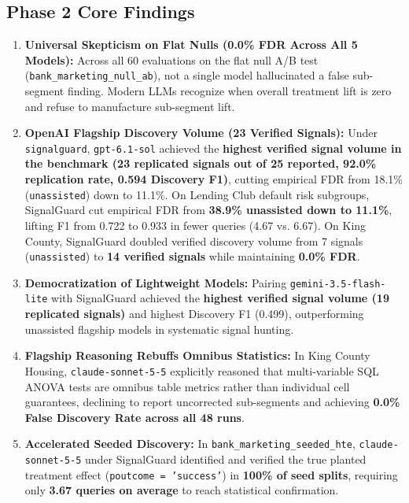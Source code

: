 \documentclass[11pt,a4paper]{article}
\begin{document}
\subsection{Phase 2 Core Findings}
\begin{enumerate}
    \item \textbf{Universal Skepticism on Flat Nulls (0.0\% FDR Across All 5 Models):} Across all 60 evaluations on the flat null A/B test (\texttt{bank\_marketing\_null\_ab}), not a single model hallucinated a false sub-segment finding. Modern LLMs recognize when overall treatment lift is zero and refuse to manufacture sub-segment lift.
    \item \textbf{OpenAI Flagship Discovery Volume (23 Verified Signals):} Under \texttt{signalguard}, \texttt{gpt-6.1-sol} achieved the \textbf{highest verified signal volume in the benchmark (23 replicated signals out of 25 reported, 92.0\% replication rate, 0.594 Discovery F1)}, cutting empirical FDR from 18.1\% (\texttt{unassisted}) down to 11.1\%. On Lending Club default risk subgroups, SignalGuard cut empirical FDR from \textbf{38.9\% unassisted down to 11.1\%}, lifting F1 from 0.722 to 0.933 in fewer queries (4.67 vs. 6.67). On King County, SignalGuard doubled verified discovery volume from 7 signals (\texttt{unassisted}) to \textbf{14 verified signals} while maintaining \textbf{0.0\% FDR}.
    \item \textbf{Democratization of Lightweight Models:} Pairing \texttt{gemini-3.5-flash-lite} with SignalGuard achieved the \textbf{highest verified signal volume (19 replicated signals)} and highest Discovery F1 (0.499), outperforming unassisted flagship models in systematic signal hunting.
    \item \textbf{Flagship Reasoning Rebuffs Omnibus Statistics:} In King County Housing, \texttt{claude-sonnet-5-5} explicitly reasoned that multi-variable SQL ANOVA tests are omnibus table metrics rather than individual cell guarantees, declining to report uncorrected sub-segments and achieving \textbf{0.0\% False Discovery Rate across all 48 runs}.
    \item \textbf{Accelerated Seeded Discovery:} In \texttt{bank\_marketing\_seeded\_hte}, \texttt{claude-sonnet-5-5} under SignalGuard identified and verified the true planted treatment effect (\texttt{poutcome = 'success'}) in \textbf{100\% of seed splits}, requiring only \textbf{3.67 queries on average} to reach statistical confirmation.

\end{enumerate}
\end{document}
